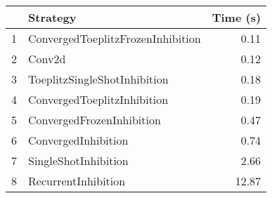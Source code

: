 \begin{tabular}{llr}
\toprule
{} &                           Strategy & Time (s) \\
\midrule
1 &  ConvergedToeplitzFrozenInhibition &     0.11 \\
2 &                             Conv2d &     0.12 \\
3 &       ToeplitzSingleShotInhibition &     0.18 \\
4 &        ConvergedToeplitzInhibition &     0.19 \\
5 &          ConvergedFrozenInhibition &     0.47 \\
6 &                ConvergedInhibition &     0.74 \\
7 &               SingleShotInhibition &     2.66 \\
8 &                RecurrentInhibition &    12.87 \\
\bottomrule
\end{tabular}
